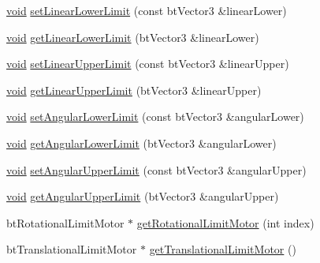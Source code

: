 \begin{DoxyCompactItemize}
\item 
\mbox{\hyperlink{_thread_8h_af1e856da2e658414cb2456cb6f7ebc66}{void}} \mbox{\hyperlink{classnjli_1_1_physics_constraint_generic6_dof_ac2635d4d1f732dbaa0607a39c42c1fb2}{set\+Linear\+Lower\+Limit}} (const bt\+Vector3 \&linear\+Lower)
\item 
\mbox{\hyperlink{_thread_8h_af1e856da2e658414cb2456cb6f7ebc66}{void}} \mbox{\hyperlink{classnjli_1_1_physics_constraint_generic6_dof_a985b84a9bf3dcdf319d5bf246785359f}{get\+Linear\+Lower\+Limit}} (bt\+Vector3 \&linear\+Lower)
\item 
\mbox{\hyperlink{_thread_8h_af1e856da2e658414cb2456cb6f7ebc66}{void}} \mbox{\hyperlink{classnjli_1_1_physics_constraint_generic6_dof_a36ecbb880f9b8d1e47295a8cb4d38ac2}{set\+Linear\+Upper\+Limit}} (const bt\+Vector3 \&linear\+Upper)
\item 
\mbox{\hyperlink{_thread_8h_af1e856da2e658414cb2456cb6f7ebc66}{void}} \mbox{\hyperlink{classnjli_1_1_physics_constraint_generic6_dof_ab5b34b9f7c16ab4d92c4c5d87836eb75}{get\+Linear\+Upper\+Limit}} (bt\+Vector3 \&linear\+Upper)
\item 
\mbox{\hyperlink{_thread_8h_af1e856da2e658414cb2456cb6f7ebc66}{void}} \mbox{\hyperlink{classnjli_1_1_physics_constraint_generic6_dof_ae30482945c39ae7b4fff65eb1e11c804}{set\+Angular\+Lower\+Limit}} (const bt\+Vector3 \&angular\+Lower)
\item 
\mbox{\hyperlink{_thread_8h_af1e856da2e658414cb2456cb6f7ebc66}{void}} \mbox{\hyperlink{classnjli_1_1_physics_constraint_generic6_dof_a8bcad5d1bb5a9a207b69197f2a9f3b17}{get\+Angular\+Lower\+Limit}} (bt\+Vector3 \&angular\+Lower)
\item 
\mbox{\hyperlink{_thread_8h_af1e856da2e658414cb2456cb6f7ebc66}{void}} \mbox{\hyperlink{classnjli_1_1_physics_constraint_generic6_dof_a09328e27ff0e4f5bf3c5f4fc399b5176}{set\+Angular\+Upper\+Limit}} (const bt\+Vector3 \&angular\+Upper)
\item 
\mbox{\hyperlink{_thread_8h_af1e856da2e658414cb2456cb6f7ebc66}{void}} \mbox{\hyperlink{classnjli_1_1_physics_constraint_generic6_dof_ac2d82f1fc8c0e094c62eaac8c46fae8e}{get\+Angular\+Upper\+Limit}} (bt\+Vector3 \&angular\+Upper)
\item 
bt\+Rotational\+Limit\+Motor $\ast$ \mbox{\hyperlink{classnjli_1_1_physics_constraint_generic6_dof_a831494acf79eaff54aa1d95d3d1c7f0e}{get\+Rotational\+Limit\+Motor}} (int index)
\item 
bt\+Translational\+Limit\+Motor $\ast$ \mbox{\hyperlink{classnjli_1_1_physics_constraint_generic6_dof_a5a05d447a6c149310f93ce8879827ecd}{get\+Translational\+Limit\+Motor}} ()

\end{DoxyCompactItemize}
